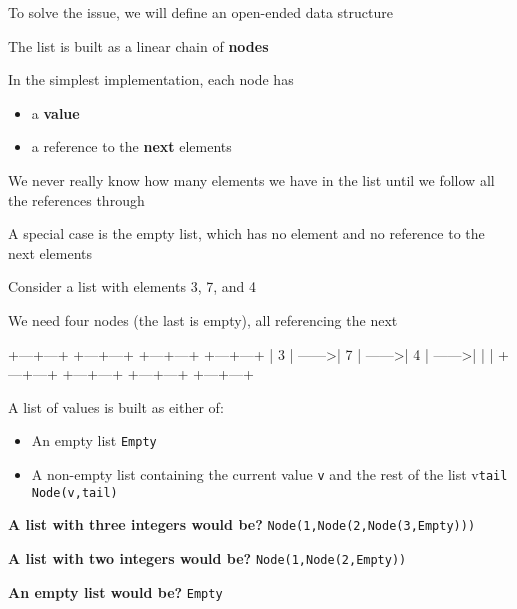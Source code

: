 \documentclass{beamer}
\begin{document}
\begin{slide}{
\item To solve the issue, we will define an open-ended data structure
\item The list is built as a linear chain of \textbf{nodes}
\item In the simplest implementation, each node has
\begin{itemize}
\item a \textbf{value}
\item a reference to the \textbf{next} elements
\end{itemize}
\item We never really know how many elements we have in the list until we follow all the references through
\item A special case is the empty list, which has no element and no reference to the next elements
}\end{slide}

\begin{frame}[fragile]
\begin{codewithblock}{\item Consider a list with elements 3, 7, and 4 \item We need four nodes (the last is empty), all referencing the next}
+---+---+    +---+---+    +---+---+    +---+---+
| 3 | ------>| 7 | ------>| 4 | ------>|   |   |
+---+---+    +---+---+    +---+---+    +---+---+
\end{codewithblock}
\end{frame}

\begin{slide}{
\item A list of values is built as either of:
\begin{itemize}
\item An empty list \texttt{Empty}
\item A non-empty list containing the current value \texttt{v} and the rest of the list v\texttt{tail} \texttt{Node(v,tail)}
\end{itemize}
\item \textbf{A list with three integers would be?} \pause \texttt{Node(1,Node(2,Node(3,Empty)))}
\item \textbf{A list with two integers would be?} \pause \texttt{Node(1,Node(2,Empty))}
\item \textbf{An empty list would be?} \pause
\texttt{Empty}
}\end{slide}
\end{document}
